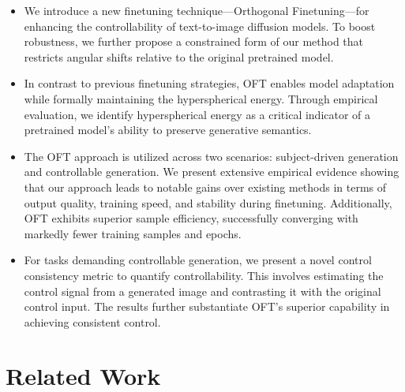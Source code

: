 \begin{itemize}[leftmargin=*,nosep]

    \item We introduce a new finetuning technique—Orthogonal Finetuning—for enhancing the controllability of text-to-image diffusion models. To boost robustness, we further propose a constrained form of our method that restricts angular shifts relative to the original pretrained model.
    \item In contrast to previous finetuning strategies, OFT enables model adaptation while formally maintaining the hyperspherical energy. Through empirical evaluation, we identify hyperspherical energy as a critical indicator of a pretrained model’s ability to preserve generative semantics.
    \item The OFT approach is utilized across two scenarios: subject-driven generation and controllable generation. We present extensive empirical evidence showing that our approach leads to notable gains over existing methods in terms of output quality, training speed, and stability during finetuning. Additionally, OFT exhibits superior sample efficiency, successfully converging with markedly fewer training samples and epochs.
    \item For tasks demanding controllable generation, we present a novel control consistency metric to quantify controllability. This involves estimating the control signal from a generated image and contrasting it with the original control input. The results further substantiate OFT’s superior capability in achieving consistent control.
\end{itemize}

\section{Related Work}

